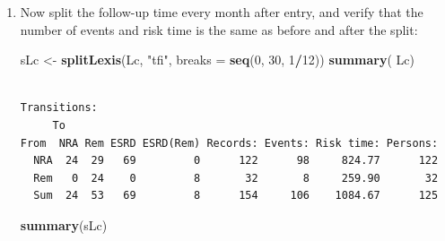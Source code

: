 \documentclass[
]{book}
\newenvironment{Shaded}{\begin{snugshade}}{\end{snugshade}}
\newcommand{\AttributeTok}[1]{\textcolor[rgb]{0.13,0.29,0.53}{#1}}
\newcommand{\DecValTok}[1]{\textcolor[rgb]{0.00,0.00,0.81}{#1}}
\newcommand{\FunctionTok}[1]{\textcolor[rgb]{0.13,0.29,0.53}{\textbf{#1}}}
\newcommand{\NormalTok}[1]{#1}
\newcommand{\OtherTok}[1]{\textcolor[rgb]{0.56,0.35,0.01}{#1}}
\newcommand{\SpecialCharTok}[1]{\textcolor[rgb]{0.81,0.36,0.00}{\textbf{#1}}}
\newcommand{\StringTok}[1]{\textcolor[rgb]{0.31,0.60,0.02}{#1}}
\theoremstyle{definition}
\theoremstyle{definition}
\theoremstyle{definition}
\theoremstyle{definition}
\theoremstyle{remark}
\begin{document}
\begin{enumerate}
\begin{verbatim}
Concordance= 0.664  (se = 0.033 )
Likelihood ratio test= 30.31  on 3 df,   p=1e-06
Wald test            = 27.07  on 3 df,   p=6e-06
Score (logrank) test = 29.41  on 3 df,   p=2e-06
\end{verbatim}

  What is the effect of of remission on the rate of ESRD?

  \section{Splitting the follow-up time}\label{splitting-the-follow-up-time}

  In order to explore the effect of remission on the rate of ESRD, we
  split the data further into small pieces of follow-up. To this
  end we use the function \texttt{splitLexis}. The rates can then be
  modeled using a Poisson-model, and the shape of the effect of the
  underlying \emph{rates} be explored. Furthermore, we can allow effects of both
  time since NRA and current age. To this end we will use splines, so we
  need the \texttt{splines} and also the \texttt{mgcv} packages.
\item
  Now split the follow-up time every month after entry, and verify
  that the number of events and risk time is the same as before and
  after the split:

\begin{Shaded}
\begin{Highlighting}[]
\NormalTok{sLc }\OtherTok{\textless{}{-}} \FunctionTok{splitLexis}\NormalTok{(Lc, }\StringTok{"tfi"}\NormalTok{, }\AttributeTok{breaks =} \FunctionTok{seq}\NormalTok{(}\DecValTok{0}\NormalTok{, }\DecValTok{30}\NormalTok{, }\DecValTok{1}\SpecialCharTok{/}\DecValTok{12}\NormalTok{))}
\FunctionTok{summary}\NormalTok{( Lc)}
\end{Highlighting}
\end{Shaded}

\begin{verbatim}

Transitions:
     To
From  NRA Rem ESRD ESRD(Rem) Records: Events: Risk time: Persons:
  NRA  24  29   69         0      122      98     824.77      122
  Rem   0  24    0         8       32       8     259.90       32
  Sum  24  53   69         8      154     106    1084.67      125
\end{verbatim}

\begin{Shaded}
\begin{Highlighting}[]
\FunctionTok{summary}\NormalTok{(sLc)}
\end{Highlighting}
\end{Shaded}


\end{enumerate}
\end{document}
